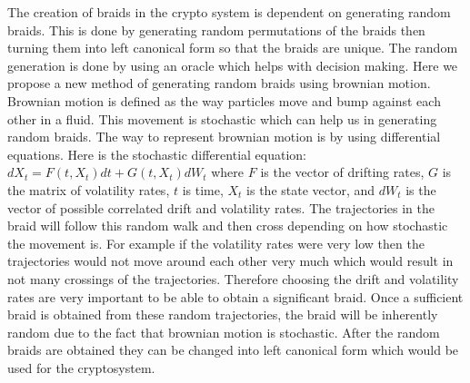 \documentclass{article}
\theoremstyle{definition}
\begin{document}
The creation of braids in the crypto system is dependent on generating random braids. This is done by generating random permutations of the braids then turning them into left canonical form so that the braids are unique. The random generation is done by using an oracle which helps with decision making. Here we propose a new method of generating random braids using brownian motion. Brownian motion is defined as the way particles move and bump against each other in a fluid. This movement is stochastic which can help us in generating random braids. The way to represent brownian motion is by using differential equations. Here is the stochastic differential equation: $dX_t=F(t,X_t) dt+G(t,X_t) dW_t$ where $F$ is the vector of drifting rates, $G$ is the matrix of volatility rates, $t$ is time, $X_t$ is the state vector, and $dW_t$ is the vector of possible correlated drift and volatility rates. The trajectories in the braid will follow this random walk and then cross depending on how stochastic the movement is. For example if the volatility rates were very low then the trajectories would not move around each other very much which would result in not many crossings of the trajectories. Therefore choosing the drift and volatility rates are very important to be able to obtain a significant braid. Once a sufficient braid is obtained from these random trajectories, the braid will be inherently random due to the fact that brownian motion is stochastic. After the random braids are obtained they can be changed into left canonical form which would be used for the cryptosystem. 
\end{document}
